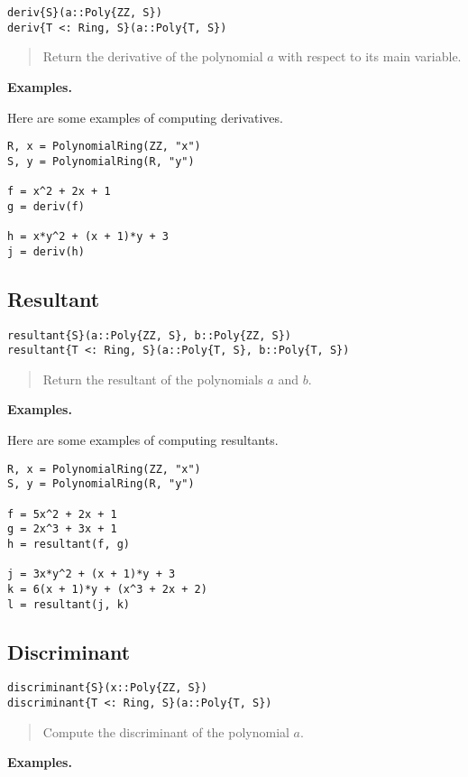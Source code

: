 \documentclass[a4paper,10pt]{article}
\newcommand{\desc}[1]{\vspace{-3mm}\begin{quote}#1\end{quote}}
\begin{document}
{{{\begin{lstlisting}
deriv{S}(a::Poly{ZZ, S})
deriv{T <: Ring, S}(a::Poly{T, S})
\end{lstlisting}

\desc{Return the derivative of the polynomial $a$ with respect to its main
variable.}

\textbf{Examples.}

Here are some examples of computing derivatives.

\begin{lstlisting}
R, x = PolynomialRing(ZZ, "x")
S, y = PolynomialRing(R, "y")

f = x^2 + 2x + 1
g = deriv(f)

h = x*y^2 + (x + 1)*y + 3
j = deriv(h)
\end{lstlisting}

\subsection{Resultant}

\begin{lstlisting}
resultant{S}(a::Poly{ZZ, S}, b::Poly{ZZ, S})
resultant{T <: Ring, S}(a::Poly{T, S}, b::Poly{T, S})
\end{lstlisting}

\desc{Return the resultant of the polynomials $a$ and $b$.}

\textbf{Examples.}

Here are some examples of computing resultants.

\begin{lstlisting}
R, x = PolynomialRing(ZZ, "x")
S, y = PolynomialRing(R, "y")

f = 5x^2 + 2x + 1
g = 2x^3 + 3x + 1
h = resultant(f, g)

j = 3x*y^2 + (x + 1)*y + 3
k = 6(x + 1)*y + (x^3 + 2x + 2)
l = resultant(j, k)
\end{lstlisting}

\subsection{Discriminant}

\begin{lstlisting}
discriminant{S}(x::Poly{ZZ, S})
discriminant{T <: Ring, S}(a::Poly{T, S})
\end{lstlisting}

\desc{Compute the discriminant of the polynomial $a$.}

\textbf{Examples.}

}}}
\end{document}
